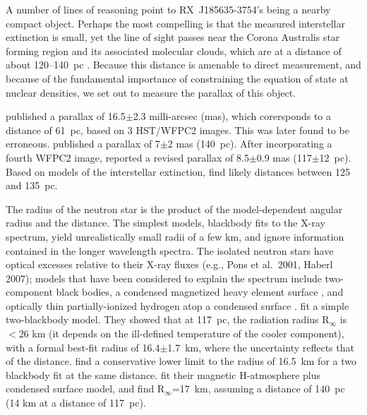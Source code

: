 \documentclass[12pt,preprint]{aastex}
\begin{document}
A number of lines of reasoning point to RX~J185635-3754's
being a nearby compact object. 
Perhaps the most compelling is that the measured interstellar extinction
is small, yet the line of sight passes near the Corona Australis star forming
region and its associated molecular clouds, which are at a distance of about
120--140~pc \citep{MR81, NF08}.
Because this distance is amenable to direct measurement, and
because of the fundamental importance of constraining the equation
of state at nuclear densities, we set out to measure the parallax of this
object.

\citet{W01} published a parallax of 16.5$\pm$2.3 milli-arcsec (mas), which
corersponds to a distance of 61~pc,
based on 3 HST/WFPC2 images.
This was later found to be erroneous.
\citet{KvKA02} published a parallax of 7$\pm$2 mas (140~pc).
After incorporating a fourth WFPC2 image,
\citet{WL02} reported a revised parallax of 8.5$\pm$0.9 mas
(117$\pm$12~pc). 
Based on models of the interstellar extinction, \citet{P07} find likely
distances between 125 and 135~pc.

The radius of the neutron star is the product of the
model-dependent angular radius and the distance.
The simplest models, blackbody fits to the X-ray spectrum, yield
unrealistically small radii of a few km, and ignore information contained in
the longer wavelength spectra. 
The isolated neutron stars have
optical excesses relative to their X-ray fluxes
(e.g., Pons et al.\ 2001, Haberl 2007);
models that have been considered to explain the spectrum include
two-component black bodies,
a condensed magnetized heavy element surface \citep{PMP05}, and
optically thin partially-ionized hydrogen atop a condensed surface \citep{Ho07}.
\citet{WL02} fit a simple two-blackbody model.
They showed that at 117~pc, the radiation radius
R$_\infty$ is $<$26 km (it depends on the ill-defined temperature of the
cooler component), with a formal best-fit radius of 16.4$\pm$1.7~km, where
the uncertainty reflects that of the distance. \cite{Tr04} find a conservative
lower limit to the radius of 16.5~km for a two blackbody fit at the same
distance.
\citet{Ho07} fit their magnetic H-atmosphere plus
condensed surface model, and find R$_\infty$=17~km, assuming a distance of
140~pc (14 km at a distance of 117~pc).
\end{document}
